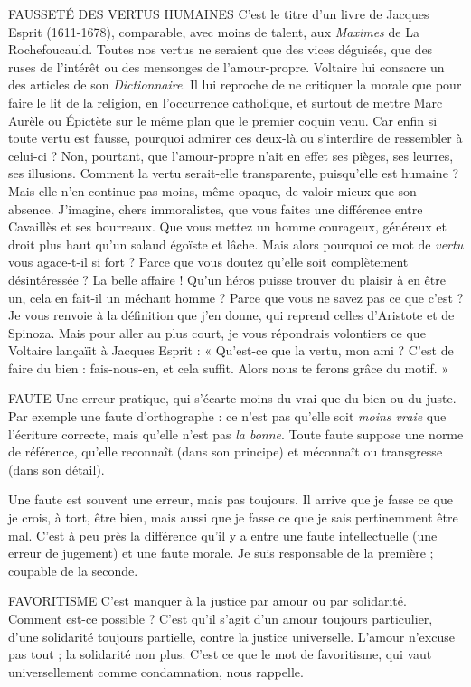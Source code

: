 FAUSSETÉ DES VERTUS HUMAINES C’est le titre d’un livre de Jacques
Esprit (1611-1678), comparable,
avec moins de talent, aux {\it Maximes} de La Rochefoucauld. Toutes nos vertus ne
seraient que des vices déguisés, que des ruses de l'intérêt ou des mensonges de
l'amour-propre. Voltaire lui consacre un des articles de son {\it Dictionnaire}. Il lui
reproche de ne critiquer la morale que pour faire le lit de la religion, en l’occurrence
catholique, et surtout de mettre Marc Aurèle ou Épictète sur le même
plan que le premier coquin venu. Car enfin si toute vertu est fausse, pourquoi
admirer ces deux-là ou s’interdire de ressembler à celui-ci ? Non, pourtant, que
l'amour-propre n’ait en effet ses pièges, ses leurres, ses illusions. Comment la
vertu serait-elle transparente, puisqu’elle est humaine ? Mais elle n’en continue
pas moins, même opaque, de valoir mieux que son absence. J'imagine, chers
immoralistes, que vous faites une différence entre Cavaillès et ses bourreaux.
Que vous mettez un homme courageux, généreux et droit plus haut qu’un
salaud égoïste et lâche. Mais alors pourquoi ce mot de {\it vertu} vous agace-t-il si
fort ? Parce que vous doutez qu’elle soit complètement désintéressée ? La belle
affaire ! Qu’un héros puisse trouver du plaisir à en être un, cela en fait-il un
méchant homme ? Parce que vous ne savez pas ce que c’est ? Je vous renvoie à
la définition que j’en donne, qui reprend celles d’Aristote et de Spinoza. Mais
pour aller au plus court, je vous répondrais volontiers ce que Voltaire lançaïit à
Jacques Esprit : « Qu'est-ce que la vertu, mon ami ? C’est de faire du bien :
fais-nous-en, et cela suffit. Alors nous te ferons grâce du motif. »

FAUTE Une erreur pratique, qui s’écarte moins du vrai que du bien ou du
juste. Par exemple une faute d'orthographe : ce n’est pas qu’elle soit
{\it moins vraie} que l'écriture correcte, mais qu’elle n’est pas {\it la bonne}. Toute faute
suppose une norme de référence, qu’elle reconnaît (dans son principe) et
méconnaît ou transgresse (dans son détail).

Une faute est souvent une erreur, mais pas toujours. Il arrive que je fasse ce
que je crois, à tort, être bien, mais aussi que je fasse ce que je sais pertinemment
être mal. C’est à peu près la différence qu’il y a entre une faute intellectuelle
(une erreur de jugement) et une faute morale. Je suis responsable de la
première ; coupable de la seconde.

FAVORITISME C'est manquer à la justice par amour ou par solidarité.
Comment est-ce possible ? C’est qu’il s’agit d’un amour
toujours particulier, d’une solidarité toujours partielle, contre la justice universelle.
L'amour n’excuse pas tout ; la solidarité non plus. C’est ce que le mot de
favoritisme, qui vaut universellement comme condamnation, nous rappelle.

